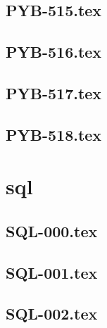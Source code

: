\renewcommand{\xxexo}{PYB-515.tex} 
\subsection*{\xxexo} 
\graphicspath{{../../exos/python_bases/PYB-515/}}
 
 
\renewcommand{\xxexo}{PYB-516.tex} 
\subsection*{\xxexo} 
\graphicspath{{../../exos/python_bases/PYB-516/}}
 
 
\renewcommand{\xxexo}{PYB-517.tex} 
\subsection*{\xxexo} 
\graphicspath{{../../exos/python_bases/PYB-517/}}
 
 
\renewcommand{\xxexo}{PYB-518.tex} 
\subsection*{\xxexo} 
\graphicspath{{../../exos/python_bases/PYB-518/}}
 
 
\section*{sql}
\renewcommand{\xxexo}{SQL-000.tex} 
\subsection*{\xxexo} 
\graphicspath{{../../exos/sql/SQL-000/}}
 
 
\renewcommand{\xxexo}{SQL-001.tex} 
\subsection*{\xxexo} 
\graphicspath{{../../exos/sql/SQL-001/}}
 
 
\renewcommand{\xxexo}{SQL-002.tex} 
\subsection*{\xxexo} 
\graphicspath{{../../exos/sql/SQL-002/}}
 
 
\renewcommand{\xxexo}{SQL-003.tex} 
